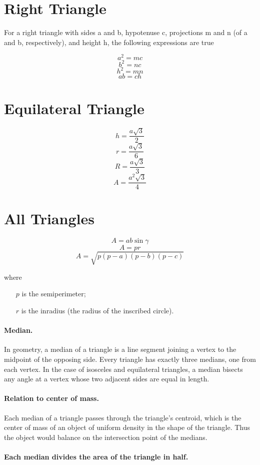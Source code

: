 \documentclass[oneside]{book} %
\theoremstyle{plain}
\begin{document}
\section{Right Triangle}
For a right triangle with sides a and b, hypotenuse c, projections m and n (of
a and b, respectively), and height h,
the following expressions are true

\[a^2 = m c\]
\[b^2 = n c\]
\[h^2 = m n\]
\[a b = c h\]

\section{Equilateral Triangle}
\[h = \frac{a \sqrt{3}}{2}\]
\[r = \frac{a \sqrt{3}}{6}\]
\[R = \frac{a \sqrt{3}}{3}\]
\[A = \frac{a^2 \sqrt{3}}{4}\]

\section{All Triangles}
\[A = a b \sin \gamma \]
\[A = p r\]
\[A = \sqrt{p \left ( p - a \right ) \left ( p - b \right ) \left ( p - c
\right )}\]

where

\begin{itemize}
  \item[\(p\)] is the semiperimeter;
  \item[\(r\)] is the inradius (the radius of the inscribed circle).
\end{itemize}

\paragraph{Median.} In geometry, a median of a triangle is a line segment
joining a vertex to the midpoint of the opposing side. Every triangle has
exactly three medians, one from each vertex. In the case of isosceles and
equilateral triangles, a median bisects any angle at a vertex whose two adjacent
sides are equal in length.

\paragraph{Relation to center of mass.} Each median of a triangle passes through
the triangle's centroid, which is the center of mass of an object of uniform
density in the shape of the triangle. Thus the object would balance on the
intersection point of the medians.

\paragraph{Each median divides the area of the triangle in half.}
\end{document}
